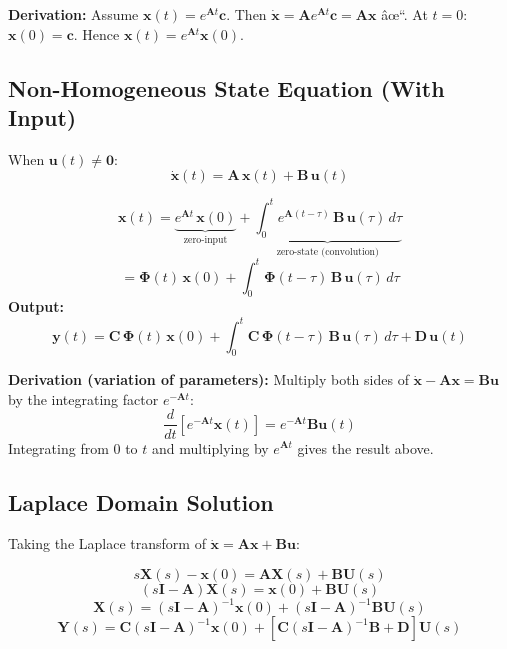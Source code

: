 \documentclass[12pt,a4paper]{article}
\begin{document}
\textbf{Derivation:} Assume $\mathbf{x}(t) = e^{\mathbf{A}t}\mathbf{c}$. Then $\dot{\mathbf{x}} = \mathbf{A}e^{\mathbf{A}t}\mathbf{c} = \mathbf{A}\mathbf{x}$ âœ“. At $t=0$: $\mathbf{x}(0) = \mathbf{c}$. Hence $\mathbf{x}(t) = e^{\mathbf{A}t}\mathbf{x}(0)$.

\subsection{Non-Homogeneous State Equation (With Input)}

When $\mathbf{u}(t) \neq \mathbf{0}$:
$$\dot{\mathbf{x}}(t) = \mathbf{A}\,\mathbf{x}(t) + \mathbf{B}\,\mathbf{u}(t)$$

\begin{tcolorbox}[formulabox, title={Solution --- Non-Homogeneous (With Input)}]
$$\boxed{\mathbf{x}(t) = \underbrace{e^{\mathbf{A}t}\,\mathbf{x}(0)}_{\text{zero-input}} + \underbrace{\int_0^t e^{\mathbf{A}(t-\tau)}\,\mathbf{B}\,\mathbf{u}(\tau)\,d\tau}_{\text{zero-state (convolution)}}}$$
$$= \boldsymbol{\Phi}(t)\,\mathbf{x}(0) + \int_0^t \boldsymbol{\Phi}(t-\tau)\,\mathbf{B}\,\mathbf{u}(\tau)\,d\tau$$
\textbf{Output:}
$$\mathbf{y}(t) = \mathbf{C}\,\boldsymbol{\Phi}(t)\,\mathbf{x}(0) + \int_0^t \mathbf{C}\,\boldsymbol{\Phi}(t-\tau)\,\mathbf{B}\,\mathbf{u}(\tau)\,d\tau + \mathbf{D}\,\mathbf{u}(t)$$
\end{tcolorbox}

\textbf{Derivation (variation of parameters):} Multiply both sides of $\dot{\mathbf{x}} - \mathbf{A}\mathbf{x} = \mathbf{B}\mathbf{u}$ by the integrating factor $e^{-\mathbf{A}t}$:
$$\frac{d}{dt}\left[e^{-\mathbf{A}t}\mathbf{x}(t)\right] = e^{-\mathbf{A}t}\mathbf{B}\mathbf{u}(t)$$
Integrating from $0$ to $t$ and multiplying by $e^{\mathbf{A}t}$ gives the result above.

\subsection{Laplace Domain Solution}

Taking the Laplace transform of $\dot{\mathbf{x}} = \mathbf{A}\mathbf{x} + \mathbf{B}\mathbf{u}$:

\begin{tcolorbox}[formulabox, title={Laplace Domain Solution}]
$$s\mathbf{X}(s) - \mathbf{x}(0) = \mathbf{A}\mathbf{X}(s) + \mathbf{B}\mathbf{U}(s)$$
$$(s\mathbf{I} - \mathbf{A})\mathbf{X}(s) = \mathbf{x}(0) + \mathbf{B}\mathbf{U}(s)$$
$$\mathbf{X}(s) = (s\mathbf{I}-\mathbf{A})^{-1}\mathbf{x}(0) + (s\mathbf{I}-\mathbf{A})^{-1}\mathbf{B}\mathbf{U}(s)$$
$$\mathbf{Y}(s) = \mathbf{C}(s\mathbf{I}-\mathbf{A})^{-1}\mathbf{x}(0) + \left[\mathbf{C}(s\mathbf{I}-\mathbf{A})^{-1}\mathbf{B} + \mathbf{D}\right]\mathbf{U}(s)$$
\end{tcolorbox}
\end{document}

